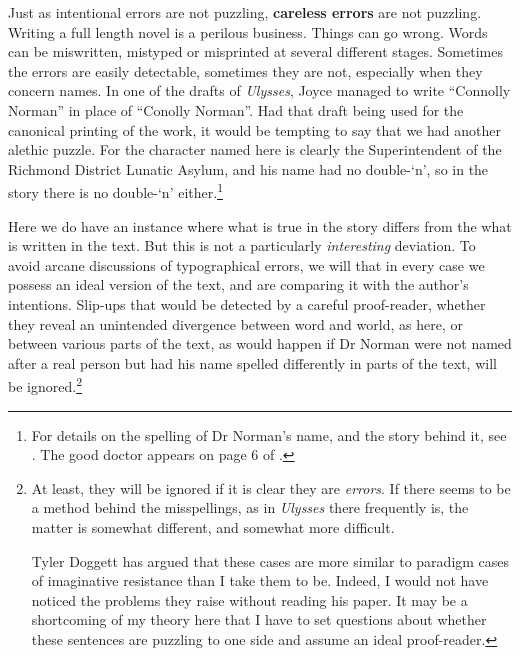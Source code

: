 Just as intentional errors are not puzzling, \textbf{careless errors} are not puzzling. Writing a full length novel is a perilous business. Things can go wrong. Words can be miswritten, mistyped or misprinted at several different stages. Sometimes the errors are easily detectable, sometimes they are not, especially when they concern names. In one of the drafts of \textit{Ulysses}, Joyce managed to write ``Connolly Norman'' in place of ``Conolly Norman''. Had that draft being used for the canonical printing of the work, it would be tempting to say that we had another alethic puzzle. For the character named here is clearly the Superintendent of the Richmond District Lunatic Asylum, and his name had no double-`n', so in the story there is no double-`n' either.\footnote{For details on the spelling of Dr Norman's name, and the story behind it, see \citet{Kidd1988}. The good doctor appears on page 6 of \citet{Joyce1922}.}

Here we do have an instance where what is true in the story differs from the what is written in the text. But this is not a particularly \textit{interesting} deviation. To avoid arcane discussions of typographical errors, we will that in every case we possess an ideal version of the text, and are comparing it with the author's intentions. Slip-ups that would be detected by a careful proof-reader, whether they reveal an unintended divergence between word and world, as here, or between various parts of the text, as would happen if Dr Norman were not named after a real person but had his name spelled differently in parts of the text, will be ignored.\footnote{At least, they will be ignored if it is clear they are \textit{errors}. If there seems to be a method behind the misspellings, as in \textit{Ulysses} there frequently is, the matter is somewhat different, and somewhat more difficult.\par Tyler Doggett has argued that these cases are more similar to paradigm cases of imaginative resistance than I take them to be. Indeed, I would not have noticed the problems they raise without reading his paper. It may be a shortcoming of my theory here that I have to set questions about whether these sentences are puzzling to one side and assume an ideal proof-reader. } 

